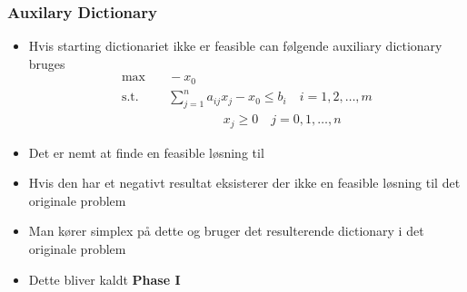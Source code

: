 \subsubsection{Auxilary Dictionary}
\begin{itemize}
	\item Hvis starting dictionariet ikke er feasible can følgende auxiliary dictionary bruges
  \begin{align*}
    \text{max} & \quad -x_0 \\
    \text{s.t.} & \quad \sum_{j=1}^n a_{ij} x_j - x_0 \leq b_i \quad i = 1,2,\dots, m \\
                & \hspace{64pt} x_j \geq 0 \quad j=0,1,\dots,n
  \end{align*}
  \item Det er nemt at finde en feasible løsning til
  \item Hvis den har et negativt resultat eksisterer der ikke en feasible løsning til det originale problem
  \item Man kører simplex på dette og bruger det resulterende dictionary i det originale problem 
  \item Dette bliver kaldt \textbf{Phase I} 
\end{itemize}

